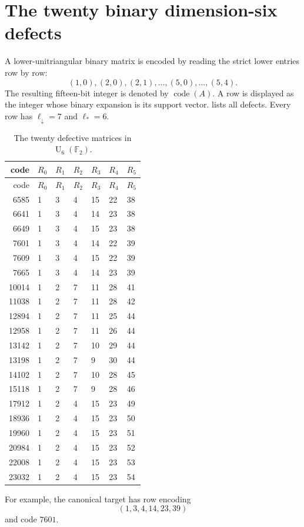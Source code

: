 \documentclass[11pt]{amsart}
\numberwithin{equation}{section}
\theoremstyle{definition}
\theoremstyle{remark}
\newcommand{\F}{\mathbb F}
\newcommand{\U}{\operatorname{U}}
\newcommand{\ellDown}{\ell_{\downarrow}}
\newcommand{\ellAll}{\ell_{*}}
\begin{document}
\appendix

\section{The twenty binary dimension-six defects}\label{app:twenty}

A lower-unitriangular binary matrix is encoded by reading the strict lower entries row by row:
\[
(1,0),
(2,0),(2,1),
\ldots,
(5,0),\ldots,(5,4).
\]
The resulting fifteen-bit integer is denoted by $\operatorname{code}(A)$.  A row is displayed as the integer whose binary expansion is its support vector.   lists all defects.  Every row has $\ellDown=7$ and $\ellAll=6$.

\begin{longtable}{@{}rllllll@{}}
\caption{The twenty defective matrices in $\U_6(\F_2)$.}\label{tab:twenty}\\
\toprule
code&$R_0$&$R_1$&$R_2$&$R_3$&$R_4$&$R_5$\\
\midrule
\endfirsthead
\toprule
code&$R_0$&$R_1$&$R_2$&$R_3$&$R_4$&$R_5$\\
\midrule
\endhead
6585&1&3&4&15&22&38\\
6641&1&3&4&14&23&38\\
6649&1&3&4&15&23&38\\
7601&1&3&4&14&22&39\\
7609&1&3&4&15&22&39\\
7665&1&3&4&14&23&39\\
10014&1&2&7&11&28&41\\
11038&1&2&7&11&28&42\\
12894&1&2&7&11&25&44\\
12958&1&2&7&11&26&44\\
13142&1&2&7&10&29&44\\
13198&1&2&7&9&30&44\\
14102&1&2&7&10&28&45\\
15118&1&2&7&9&28&46\\
17912&1&2&4&15&23&49\\
18936&1&2&4&15&23&50\\
19960&1&2&4&15&23&51\\
20984&1&2&4&15&23&52\\
22008&1&2&4&15&23&53\\
23032&1&2&4&15&23&54\\
\bottomrule
\end{longtable}

For example, the canonical target has row encoding
\[
(1,3,4,14,23,39)
\]
and code $7601$.
\end{document}
